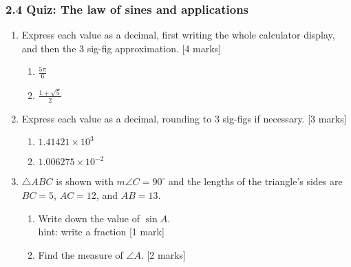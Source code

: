 \documentclass[12pt, twoside]{article}
\begin{document}
\subsubsection*{2.4 Quiz: The law of sines and applications}

\begin{enumerate}

  \item Express each value as a decimal, first writing the whole calculator display, and then the 3 sig-fig approximation. \hfill [4 marks]
  \begin{multicols}{2}
    \begin{enumerate}
    \item $\displaystyle \frac{5\pi}{6}$
    \item $\displaystyle \frac{1+ \sqrt{5}}{2}$
    \end{enumerate}
  \end{multicols} \vspace{3cm}

  \item Express each value as a decimal, rounding to 3 sig-figs if necessary. \hfill [3 marks]
  \begin{multicols}{2}
    \begin{enumerate}
    \item $1.41421 \times 10^3$
    \item $1.006275 \times 10^{-2}$
    \end{enumerate}
  \end{multicols} \vspace{2cm}

  \item $\triangle ABC$ is shown with $m\angle C=90^\circ$ and the lengths of the triangle's sides are $BC=5$, $AC=12$, and $AB=13$. \vspace{1cm}
  \begin{multicols}{2}
        \begin{enumerate}
        \item Write down the value of $\sin A$.  \\hint: write a fraction \hfill [1 mark]\vspace{2.5cm}
        \item Find the measure of $\angle A$.  \hfill [2 marks] \vspace{1cm}
      \end{enumerate}
    \end{multicols}


\end{enumerate}
\end{document}
